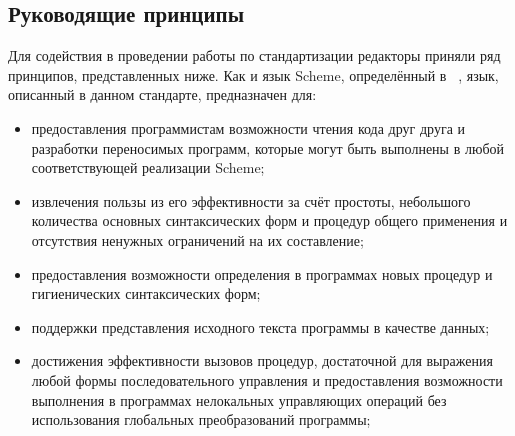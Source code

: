 \subsection*{Руководящие принципы}

Для содействия в проведении работы по стандартизации редакторы приняли ряд принципов, представленных
ниже. Как и язык Scheme, определённый в ~\cite{R5RS}, язык, описанный в данном стандарте,
предназначен для:\vspace{-1mm}

\begin{itemize}
\item предоставления программистам возможности чтения кода друг друга и разработки
  переносимых программ, которые могут быть выполнены в любой соответствующей реализации Scheme;

\item извлечения пользы из его эффективности за счёт простоты, небольшого количества основных
  синтаксических форм и процедур общего применения и отсутствия ненужных ограничений на их
  составление;

\item предоставления возможности определения в программах новых процедур и гигиенических
синтаксических форм;

\item поддержки представления исходного текста программы в качестве данных;

\item достижения эффективности вызовов процедур, достаточной для выражения любой формы
  последовательного управления и предоставления возможности выполнения в программах нелокальных
  управляющих операций без использования глобальных преобразований программы;\vspace{-1.2mm}


\end{itemize}
